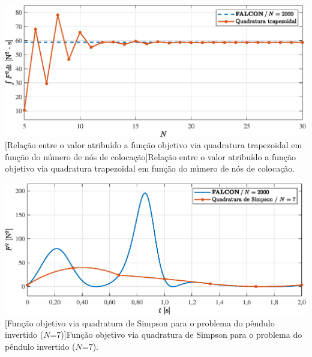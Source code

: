 \noindent	
\begin{minipage}{\textwidth}
	\vspace{\onelineskip}
	\centering
	\includegraphics[scale=0.7]{fig/resultados/penduloInvertido/obs/trap/NvsJ}
	[Relação entre o valor atribuído a função objetivo via quadratura trapezoidal em função do número de nós de colocação]{Relação entre o valor atribuído a função objetivo via quadratura trapezoidal em função do número de nós de colocação.}
	\label{fig:penduloInvertido:trap:NvsJ}
	\vspace{\onelineskip}
\end{minipage}

\noindent	
\begin{minipage}{\textwidth}
	\vspace{\onelineskip}
	\centering
	\includegraphics[scale=0.7]{fig/resultados/penduloInvertido/obs/hersim/N=7}
	[Função objetivo via quadratura de Simpson para o problema do pêndulo invertido ($N$=7)]{Função objetivo via quadratura de Simpson para o problema do pêndulo invertido ($N$=7).}
	\label{fig:penduloInvertido:hersim:N=7}
	\vspace{\onelineskip}
\end{minipage}

